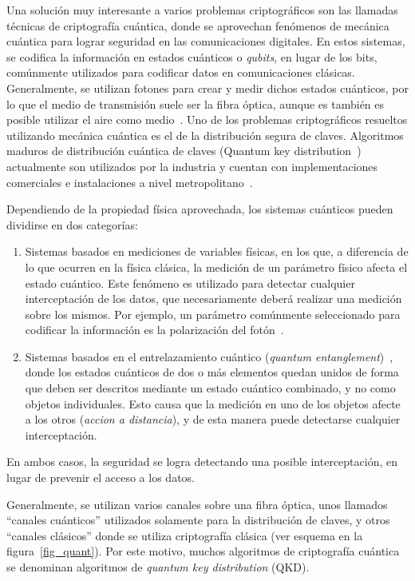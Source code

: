 \label{quantcry}
Una solución muy interesante a varios problemas criptográficos son las llamadas técnicas de criptografía cuántica, donde se aprovechan fenómenos de mecánica cuántica para lograr seguridad en las comunicaciones digitales.
En estos sistemas, se codifica la información en estados cuánticos o \textit{qubits}, en lugar de los bits, comúnmente utilizados para codificar datos en comunicaciones clásicas. Generalmente, se utilizan fotones para crear y medir dichos estados cuánticos, por lo que el medio de transmisión suele ser la fibra óptica, aunque es también es posible utilizar el aire como medio~\cite{alleaume2004experimental}.
Uno de los problemas criptográficos resueltos utilizando mecánica cuántica es el de la distribución segura de claves. Algoritmos maduros de distribución cuántica de claves (Quantum key distribution~\cite{bb84}) actualmente son utilizados por la industria y cuentan con implementaciones comerciales e instalaciones a nivel metropolitano~\cite{sasaki2011field}. 

Dependiendo de la propiedad física aprovechada, los sistemas cuánticos pueden dividirse en dos categorías:
\begin{enumerate}
 \item Sistemas basados en mediciones de variables físicas, en los que, a diferencia de lo que ocurren en la física clásica, la medición de un parámetro físico afecta el estado cuántico. Este fenómeno es utilizado para detectar cualquier interceptación de los datos, que necesariamente deberá realizar una medición sobre los mismos. Por ejemplo, un parámetro comúnmente seleccionado para codificar la información es la polarización del fotón~\cite{muller1993experimental}.
 \item Sistemas basados en el entrelazamiento cuántico (\textit{quantum entanglement})~\cite{jennewein2000quantum}, donde los estados cuánticos de dos o más elementos quedan unidos de forma que deben ser descritos mediante un estado cuántico combinado, y no como objetos individuales. Esto causa que la medición en uno de los objetos afecte a los otros (\textit{accion a distancia}), y de esta manera puede detectarse cualquier interceptación.
\end{enumerate}

En ambos casos, la seguridad se logra detectando una posible interceptación, en lugar de prevenir el acceso a los datos.

Generalmente, se utilizan varios canales sobre una fibra óptica, unos llamados ``canales cuánticos'' utilizados solamente para la distribución de claves, y otros ``canales clásicos'' donde se utiliza criptografía clásica (ver esquema en la figura~\ref{fig_quant}). Por este motivo, muchos algoritmos de criptografía cuántica se denominan algoritmos de \textit{quantum key distribution} (QKD).

